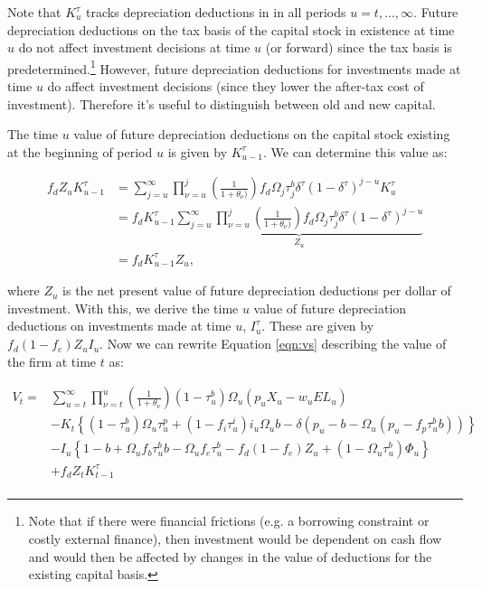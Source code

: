 \noindent\noindent Note that $K^{\tau}_{u}$ tracks depreciation deductions in in all periods $u=t,...,\infty$.  Future depreciation deductions on the tax basis of the capital stock in existence at time $u$ do not affect investment decisions at time $u$ (or forward) since the tax basis is predetermined.\footnote{Note that if there were financial frictions (e.g. a borrowing constraint or costly external finance), then investment would be dependent on cash flow and would then be affected by changes in the value of deductions for the existing capital basis.}  However, future depreciation deductions for investments made at time $u$ do affect investment decisions (since they lower the after-tax cost of investment).  Therefore it's useful to distinguish between old and new capital. 

The time $u$ value of future depreciation deductions on the capital stock existing at the beginning of period $u$ is given by $K^{\tau}_{u-1}$.  We can determine this value as:

\begin{equation}
\label{eqn:z}
\begin{split}
f_{d}Z_{u}K^{\tau}_{u-1} &=  \sum^{\infty}_{j=u} \prod_{\nu=u}^{j} \left(\frac{1}{1+\theta_{\nu})}\right)f_{d}\Omega_{j}\tau^{b}_{j}\delta^{\tau}(1-\delta^{\tau})^{j-u}K^{\tau}_{u} \\
&= f_{d} K^{\tau}_{u-1} \underbrace{\sum^{\infty}_{j=u} \prod_{\nu=u}^{j} \left(\frac{1}{1+\theta_{\nu})}\right)f_{d}\Omega_{j}\tau^{b}_{j}\delta^{\tau}(1-\delta^{\tau})^{j-u}}_{Z_{u}} \\
& = f_{d} K^{\tau}_{u-1} Z_{u},
\end{split}
\end{equation}

\noindent\noindent where $Z_{u}$ is the net present value of future depreciation deductions per dollar of investment.  With this, we derive the time $u$ value of future depreciation deductions on investments made at time $u$, $I^{\tau}_{u}$.  These are given by $f_{d}(1-f_{e})Z_{u}I_{u}$.  Now we can rewrite Equation \ref{eqn:vs} describing the value of the firm at time $t$ as: 

 \begin{equation}
\label{eqn:vs_w_z}
\begin{split}
V_{t} = &  \sum_{u=t}^{\infty} \prod_{\nu=t}^{u}\left(\frac{1}{1+\theta_{\nu}}\right) (1-\tau^{b}_{u})\Omega_{u}(p_{u}X_{u}-w_{u}EL_{u})  \\ 
 & - K_{t} \left\{(1-\tau^{b}_{u})\Omega_{u}\tau^{p}_{u}+(1-f_{i}\tau^{i}_{u})i_{u}\Omega_{u}b-\delta(p_{u}-b-\Omega_{u}(p_{u}-f_{p}\tau^{b}_{u}b))\right\}  \\
 & - I_{u}\left\{1-b+\Omega_{u}f_{b}\tau^{b}_{u}b-\Omega_{u}f_{e}\tau^{b}_{u} - f_{d}(1-f_{e})Z_{u} + (1-\Omega_{u}\tau^{b}_{u})\Phi_{u}\right\} \\
 &  + f_{d}Z_{t}K^{\tau}_{t-1} \\
\end{split}
\end{equation}

